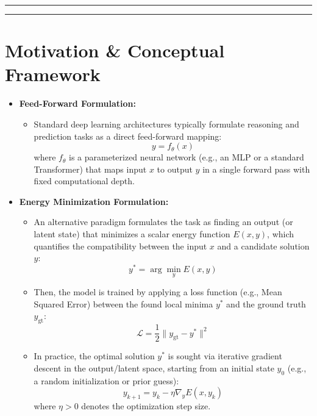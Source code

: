 \documentclass[11pt,a4paper]{article}
\begin{document}
\vspace{0.8em}
\hrule
\vspace{0.5em}

\tableofcontents

\vspace{0.8em}
\hrule
\vspace{1em}

\section{Motivation \& Conceptual Framework}
\label{sec:motivation}

\begin{itemize}[leftmargin=1.5em]
    \item \textbf{Feed-Forward Formulation:}
    \begin{itemize}[leftmargin=1.2em]
        \item Standard deep learning architectures typically formulate reasoning and prediction tasks as a direct feed-forward mapping:
        \begin{equation}
            y = f_\theta(x)
        \end{equation}
        where $f_\theta$ is a parameterized neural network (e.g., an MLP or a standard Transformer) that maps input $x$ to output $y$ in a single forward pass with fixed computational depth.
    \end{itemize}

    \item \textbf{Energy Minimization Formulation:}
    \begin{itemize}[leftmargin=1.2em]
        \item An alternative paradigm formulates the task as finding an output (or latent state) that minimizes a scalar energy function $E(x, y)$, which quantifies the compatibility between the input $x$ and a candidate solution $y$:
        \begin{equation}
            y^* = \arg\min_y E(x, y)
        \end{equation}
        \item Then, the model is trained by applying a loss function (e.g., Mean Squared Error) between the found local minima $y^*$ and the ground truth $y_{\text{gt}}$:
        \begin{equation}
            \mathcal{L} = \frac{1}{2} \|y_{\text{gt}} - y^*\|^2
        \end{equation}
        \item In practice, the optimal solution $y^*$ is sought via iterative gradient descent in the output/latent space, starting from an initial state $y_0$ (e.g., a random initialization or prior guess):
        \begin{equation}
            y_{k+1} = y_k - \eta \nabla_y E(x, y_k)
        \end{equation}
        where $\eta > 0$ denotes the optimization step size.
    \end{itemize}


\end{itemize}
\end{document}
